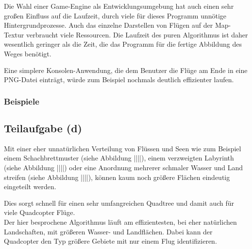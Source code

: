 \documentclass[a4paper,12pt]{article}
\begin{document}
Die Wahl einer Game-Engine als Entwicklungsumgebung hat auch einen sehr großen Einfluss auf die Laufzeit, durch viele für dieses Programm unnötige Hintergrundprozesse. Auch das einzelne Darstellen von Flügen auf der Map-Textur verbraucht viele Ressourcen. Die Laufzeit des puren Algorithmus ist daher wesentlich geringer als die Zeit, die das Programm für die fertige Abbildung des Weges benötigt.

Eine simplere Konsolen-Anwendung, die dem Benutzer die Flüge am Ende in eine PNG-Datei einträgt, würde zum Beispiel nochmals deutlich effizienter laufen.


\subsubsection{Beispiele}

\subsection{Teilaufgabe (d)}
Mit einer eher unnatürlichen Verteilung von Flüssen und Seen wie zum Beispiel einem Schachbrettmuster (siehe Abbildung ||||), einem verzweigten Labyrinth (siehe Abbildung ||||) oder eine Anordnung mehrerer schmaler Wasser und Land streifen (siehe Abbildung ||||), können kaum noch größere Flächen eindeutig eingeteilt werden.

Dies sorgt schnell für einen sehr umfangreichen Quadtree und damit auch für viele Quadcopter Flüge.
\\[0.4cm]
Der hier besprochene Algorithmus läuft am effizientesten, bei eher natürlichen Landschaften, mit größeren Wasser- und Landflächen. Dabei kann der Quadcopter den Typ größere Gebiete mit nur einem Flug identifizieren.
\end{document}
